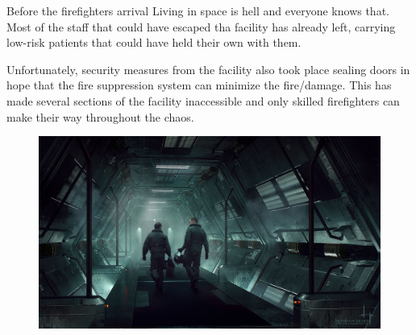 \newsect

\begin{rpg-commentbox}{Before the firefighters arrival}
    Living in space is hell and everyone knows that. Most of the staff that could have escaped tha facility has already left, carrying low-risk patients that could have held their own with them. 

    Unfortunately, security measures from the facility also took place sealing doors in hope that the fire suppression system can minimize the fire/damage. 
    This has made several sections of the facility inaccessible and only skilled firefighters can make their way throughout the chaos.
\end{rpg-commentbox}


\newsect


\begin{figure}[!b]
    \centering
    \includegraphics[width=.45\textwidth]{img/bg/crew.jpg}
\end{figure}


\clearpage



